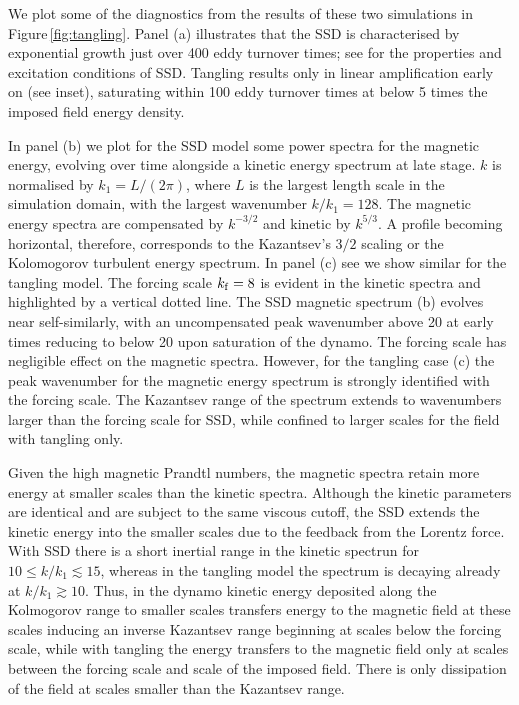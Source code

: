 \documentclass[preprint2]{aastex63}
\newcommand\kf{k_{\rm f} }
\begin{document}
We plot some of the diagnostics from the results of these two simulations in 
Figure\,\ref{fig:tangling}.
Panel (a) illustrates that the SSD is characterised by
exponential growth just over 400 eddy turnover times; see \cite{ZRS83} for the
properties and excitation conditions of SSD.
Tangling results only in linear amplification early on (see inset), saturating
within 100 eddy turnover times at below 5 times the imposed field energy
density.

In panel (b) we plot for the SSD model some power spectra for the magnetic
energy, evolving over time alongside a kinetic energy spectrum at late stage.
$k$ is normalised by $k_1=L/(2\pi)$, where $L$ is the largest length scale in
the simulation domain, with the largest wavenumber $k/k_1=128$.
The magnetic energy spectra are compensated by $k^{-3/2}$ and kinetic by
$k^{5/3}$.
A profile becoming horizontal, therefore, corresponds to the Kazantsev's
$3/2$ scaling \citep{Sch02,BS14} or the Kolomogorov turbulent energy spectrum.
In panel (c) see we show similar for the tangling model.
The forcing scale $\kf=8$ is evident in the kinetic spectra and highlighted by 
a vertical dotted line.
The SSD magnetic spectrum (b) evolves near self-similarly, with an uncompensated
peak wavenumber above 20 at early times reducing to below 20 upon saturation of
the dynamo.
The forcing scale has negligible effect on the magnetic spectra.
However, for the tangling case (c) the peak wavenumber for the magnetic energy
spectrum is strongly identified with the forcing scale.
The Kazantsev range of the spectrum extends to wavenumbers larger than the 
forcing scale for SSD, while confined to larger scales for the field with
tangling only.

Given the high magnetic Prandtl numbers, the magnetic spectra retain more energy
at smaller scales than the kinetic spectra.
Although the kinetic parameters are identical and are subject to the same 
viscous cutoff, the SSD extends the kinetic energy into the 
smaller scales
due to the feedback from the Lorentz force.
With SSD there is a short inertial range in the kinetic spectrun 
for $10\leq k/k_1\lesssim 15$, whereas in the tangling model the spectrum is
decaying already at $k/k_1\gtrsim10$.
Thus, in the dynamo kinetic energy deposited along the Kolmogorov range to
smaller scales transfers energy to the magnetic field at these scales
inducing an inverse Kazantsev range beginning at scales below the forcing
scale, while with tangling the energy transfers to the magnetic field
only at scales between the forcing scale and scale of the imposed field.
There is only dissipation of the field at scales smaller than the Kazantsev 
range.
\end{document}
